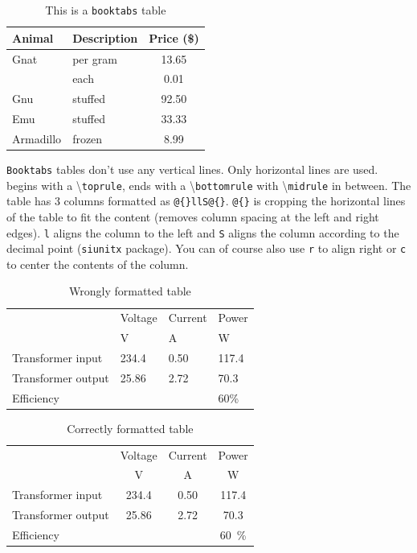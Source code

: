 \begin{table}[H]
\centering
\caption{This is a \texttt{booktabs} table}
\label{tab:tableExample}
\begin{tabular}{@{}llS@{}}
\toprule
Animal     & Description & {Price (\$)} \\ \midrule
Gnat       & per gram    & 13.65      \\
           & each        & 0.01       \\
Gnu        & stuffed     & 92.50      \\
Emu        & stuffed     & 33.33      \\
Armadillo  & frozen      & 8.99       \\ \bottomrule
\end{tabular}
\end{table}
\texttt{Booktabs} tables don't use any vertical lines. Only horizontal lines are used.  begins with a \textbackslash \texttt{toprule}, ends with a \textbackslash \texttt{bottomrule} with \textbackslash \texttt{midrule} in between. The table has 3 columns formatted as \texttt{@\{\}llS@\{\}}. \texttt{@\{\}} is cropping the horizontal lines of the table to fit the content (removes column spacing at the left and right edges). \texttt{l} aligns the column to the left and \texttt{S} aligns the column according to the decimal point (\texttt{siunitx} package). You can of course also use \texttt{r} to align right or \texttt{c} to center the contents of the column.

\begin{table}[H]
\centering
\caption{Wrongly formatted table}
\label{tab:tableExampleWrong}
\begin{tabular}{llll}
\toprule
                    & Voltage & Current   & Power   \\
                    & V       & A         & W       \\ \midrule
Transformer input   & 234.4   & 0.50      & 117.4   \\ \midrule
Transformer output  & 25.86   & 2.72      & 70.3    \\ \midrule
Efficiency          &         &           & 60\%    \\ \bottomrule
\end{tabular}
\end{table}

\begin{table}[H]
\centering
\caption{Correctly formatted table}
\label{tab:tableExampleCorrect}
\begin{tabular}{@{}lSSS@{}}
\toprule
                    & {Voltage} & {Current} & {Power}       \\
                    & V         & A         & W             \\ \midrule
Transformer input   & 234.4     & 0.50      & 117.4         \\
Transformer output  & 25.86     & 2.72      & 70.3          \\ \midrule
Efficiency          &           &           & \SI{60}{\percent} \\ \bottomrule
\end{tabular}
\end{table}

